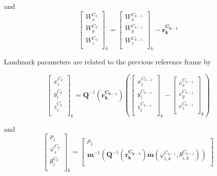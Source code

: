 \noindent and
\begin{equation}
\begin{bmatrix}
W_{x}^{C_{k}} \\
W_{y}^{C_{k}} \\
W_{z}^{C_{k}} \\
\end{bmatrix}_{k}= \begin{bmatrix}
W_{x}^{C_{k-1}} \\
W_{y}^{C_{k-1}} \\
W_{z}^{C_{k-1}} \\
\end{bmatrix}_{k}-\boldsymbol{r_k^{C_{k-1}}}
\end{equation}
 
Landmark parameters are related to the previous reference frame by

\begin{equation}
\begin{bmatrix}
x_{i}^{C_{k}} \\
y_{i}^{C_{k}} \\
z_{i}^{C_{k}} \\
\end{bmatrix}_{k}=\boldsymbol{Q}^{-1}(\boldsymbol{r_k^{C_{k-1}}})\left(
\begin{bmatrix}
x_{i}^{C_{k-1}} \\
y_{i}^{C_{k-1}} \\
z_{i}^{C_{k-1}} \\
\end{bmatrix}_{k}- \begin{bmatrix}
c_{x}^{C_{k-1}} \\
c_{y}^{C_{k-1}} \\
c_{z}^{C_{k-1}} \\
\end{bmatrix}_{k}\right)
\end{equation}

\noindent and
\begin{equation}
\begin{bmatrix}
\rho_{i} \\
\varphi_{i}^{C_{k}} \\
\theta_{i}^{C_{k}} \\
\end{bmatrix}_{k}=
\begin{bmatrix}
\rho _{i} \\
\boldsymbol{m}^{-1}\left(\boldsymbol{Q}^{-1}(\boldsymbol{r_k^{C_{k-1}}})\boldsymbol{m}(\varphi _{i, k}^{C_{k-1}}, \theta _{i, k}^{C_{k-1}})\right) \\
\end{bmatrix}
\end{equation}

